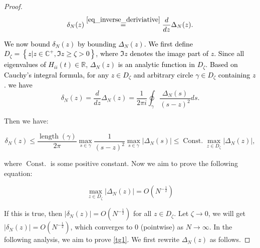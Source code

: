 \documentclass{article}
\newcommand{\mb}{\mathbb}
\newcommand{\1}{^{(1)}}
\newcommand{\2}{^{(2)}}
\renewcommand{\l}{\left}
\renewcommand{\r}{\right}
\newcommand{\be}{\begin{equation}}
\newcommand{\ee}{\end{equation}}
\newcommand{\yushunrevise}[1]{\textcolor{black}{ #1}}
\begin{document}
\begin{proof}
    $$\delta_N(z) \overset{\eqref{eq_inverse_deriviative}}{=}\frac{d}{dz}\Delta_N(z).$$
    
    
   \yushunrevise{We now bound $\delta_N(z)$ by bounding $\Delta_N(z)$. We 
    first define $D_{\zeta} = \left\{z | z\in \mb{C}^+, \Im z \geq \zeta >0 \right\}$, where $\Im z$ denotes the image part of $z$. 
    Since all eigenvalues of $H_{ii}(t) \in \mb{R}$, $\Delta_N(z)$ is an analytic function in  $D_{\zeta} $.  Based on  Cauchy's integral formula, for any $z  \in D_{\zeta} $ and arbitrary circle $\gamma \in D_{\zeta} $ containing $z$. we  have}
    $$
    \delta_N(z) = \frac{d}{dz}\Delta_N(z) = \frac{1}{2 \pi i} \oint_\gamma \frac{\Delta_N(s) }{(s-z)^{2}} d s.
    $$
    
    Then we have:
    
    $$\delta_N(z)  \leq \frac{\operatorname{length}(\gamma)}{2 \pi}  \max_{s\in \gamma} \frac{1}{(s-z)^2}  \max_{s\in \gamma} \left|\Delta_N(s)\right| \leq \operatorname{Const.} \max_{z\in D_\zeta } \left| \Delta_N(z) \right|,$$
    
    where $\operatorname{Const.} $ is some positive constant. Now we aim to prove the following equation:
    
    \be \label{tg1}
    \max_{z\in D_\zeta } \left| \Delta_N(z) \right| = O\l(N^{-\frac{1}{2}}\r)
    \ee    
    
    If this is true, then $|\delta_N(z)| = O(N^{-\frac{1}{2}})$ for all $z \in D_\zeta$. Let $\zeta \rightarrow 0$, we will get $|\delta_N(z)|  = O(N^{-\frac{1}{2}})$, which converges to 0 (pointwise) as $N \rightarrow \infty$.      In the following analysis, we aim to prove \eqref{tg1}. We first rewrite $\Delta_N(z)$ as follows. 
    
    
    


\end{proof}
\end{document}
